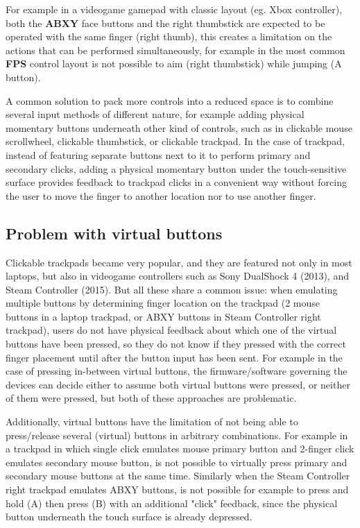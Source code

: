 \documentclass[10pt, twocolumn, a4paper]{article}
\begin{document}
    For example in a videogame gamepad with classic layout (eg. Xbox controller), both the \textbf{ABXY} face buttons and the right thumbstick are expected to be operated with the same finger (right thumb), this creates a limitation on the actions that can be performed simultaneously, for example in the most common \textbf{FPS} control layout is not possible to aim (right thumbstick) while jumping (A button).

    A common solution to pack more controls into a reduced space is to combine several input methods of different nature, for example adding physical momentary buttons underneath other kind of controls, such as in clickable mouse scrollwheel, clickable thumbstick, or clickable trackpad. In the case of trackpad, instead of featuring separate buttons next to it to perform primary and secondary clicks, adding a physical momentary button under the touch-sensitive surface provides feedback to trackpad clicks in a convenient way without forcing the user to move the finger to another location nor to use another finger.

    \subsection{Problem with virtual buttons}
        Clickable trackpads became very popular, and they are featured not only in most laptops, but also in videogame controllers such as Sony DualShock 4 (2013), and Steam Controller (2015). But all these share a common issue: when emulating multiple buttons by determining finger location on the trackpad (2 mouse buttons in a laptop trackpad, or ABXY buttons in Steam Controller right trackpad), users do not have physical feedback about which one of the virtual buttons have been pressed, so they do not know if they pressed with the correct finger placement until after the button input has been sent. For example in the case of pressing in-between virtual buttons, the firmware/software governing the devices can decide either to assume both virtual buttons were pressed, or neither of them were pressed, but both of these approaches are problematic.

        Additionally, virtual buttons have the limitation of not being able to press/release several (virtual) buttons in arbitrary combinations. For example in a trackpad in which single click emulates mouse primary button and 2-finger click emulates secondary mouse button, is not possible to virtually press primary and secondary mouse buttons at the same time. Similarly when the Steam Controller right trackpad emulates ABXY buttons, is not possible for example to press and hold (A) then press (B) with an additional "click" feedback, since the physical button underneath the touch surface is already depressed.
\end{document}
